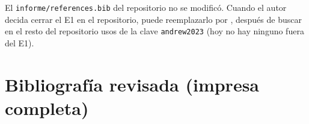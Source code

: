 El \texttt{informe/references.bib} del repositorio no se modificó. Cuando el autor decida cerrar el E1 en el repositorio, puede reemplazarlo por , después de buscar en el resto del repositorio usos de la clave \texttt{andrew2023} (hoy no hay ninguno fuera del E1).

\section{Bibliografía revisada (impresa completa)}

\nocite{*}



